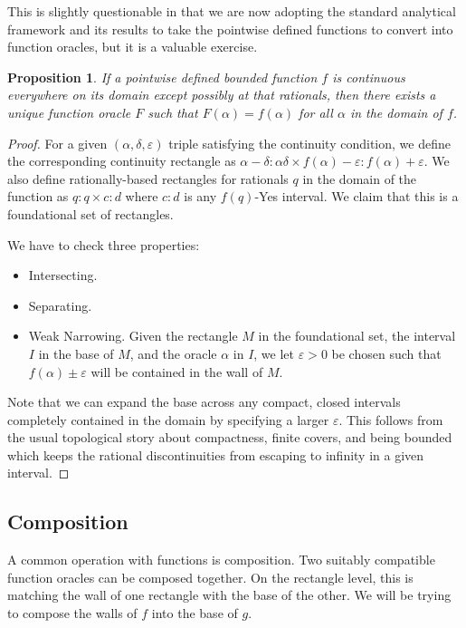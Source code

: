 \documentclass[12pt]{article}
\newtheorem{proposition}{Proposition}[section]
\begin{document}
This is slightly questionable in that we are now adopting the standard analytical framework and its results to take the pointwise defined functions to convert into function oracles, but it is a valuable exercise. 

\begin{proposition}
    If a pointwise defined bounded function $f$ is continuous everywhere on its domain except possibly at that rationals, then there exists a unique function oracle $F$ such that $F(\alpha) = f(\alpha)$ for all $\alpha$ in the domain of $f$.
\end{proposition}

\begin{proof}
    For a given $(\alpha, \delta, \varepsilon)$ triple satisfying the continuity condition, we define the corresponding continuity rectangle as $\alpha-\delta : \alpha \delta \times f(\alpha)-\varepsilon: f(\alpha)+\varepsilon$. We also define rationally-based rectangles for rationals $q$ in the domain of the function as $q:q \times c:d$ where $c:d$ is any $f(q)$-Yes interval. We claim that this is a foundational set of rectangles. 

    We have to check three properties:

    \begin{itemize}
        \item Intersecting. 
        \item Separating. 
        \item Weak Narrowing. Given the rectangle $M$ in the foundational set, the interval $I$ in the base of $M$, and the oracle $\alpha$ in $I$, we let $\varepsilon > 0$ be chosen such that $f(\alpha)\pm \varepsilon$ will be contained in the wall of $M$. 
    \end{itemize}

    Note that we can expand the base across any compact, closed intervals completely contained in the domain by specifying a larger $\varepsilon$. This follows from the usual topological story about compactness, finite covers, and being bounded which keeps the rational discontinuities from escaping to infinity in a given interval. 
    
\end{proof}

\subsection{Composition}

A common operation with functions is composition. Two suitably compatible function oracles can be composed together. On the rectangle level, this is matching the wall of one rectangle with the base of the other. We will be trying to compose the walls of $f$ into the base of $g$.
\end{document}
